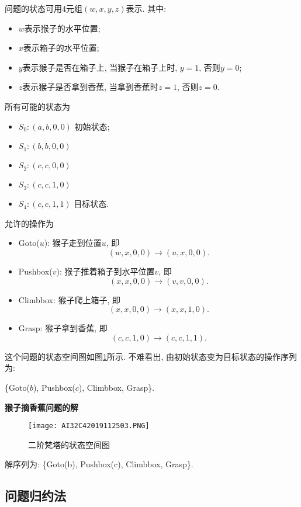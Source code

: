 \begin{result}
问题的状态可用4元组$(w, x, y, z)$表示. 其中:
\begin{itemize}
\item $w$表示猴子的水平位置;
\item $x$表示箱子的水平位置;
\item $y$表示猴子是否在箱子上, 当猴子在箱子上时, $y=1$, 否则$y=0$;
\item $z$表示猴子是否拿到香蕉, 当拿到香蕉时$z=1$, 否则$z=0$.
\end{itemize}
所有可能的状态为
\begin{itemize}
\item $S_0: (a, b, 0, 0)$    初始状态;
\item $S_1: (b, b, 0, 0)$
\item $S_2: (c, c, 0, 0)$
\item $S_3: (c, c, 1, 0)$
\item $S_4: (c, c, 1, 1)$    目标状态.
\end{itemize}
允许的操作为
\begin{itemize}
\item Goto($u$): 猴子走到位置$u$, 即
         $$(w, x, 0, 0) \rightarrow (u, x, 0, 0).$$
\item Pushbox($v$): 猴子推着箱子到水平位置$v$, 即
         $$(x, x, 0, 0) \rightarrow (v, v, 0, 0).$$
\item Climbbox: 猴子爬上箱子, 即
         $$(x, x, 0, 0) \rightarrow (x, x, 1, 0).$$
\item Grasp: 猴子拿到香蕉, 即
         $$(c, c, 1, 0 ) \rightarrow (c, c, 1, 1).$$
\end{itemize}
这个问题的状态空间图如图\ref{AI32fig2019120224}所示. 不难看出, 由初始状态变为目标状态的操作序列为:
\begin{center}
  \{Goto($b$), Pushbox($c$), Climbbox, Grasp\}.
\end{center}
\textbf{猴子摘香蕉问题的解}
\begin{figure}[H]
\centering
\texttt{[image: AI32C42019112503.PNG]}
\caption{二阶梵塔的状态空间图}
\label{AI32fig2019120224}
\end{figure}
解序列为: \{Goto(b), Pushbox(c), Climbbox, Grasp\}.
\end{result}
\subsection{问题归约法}
